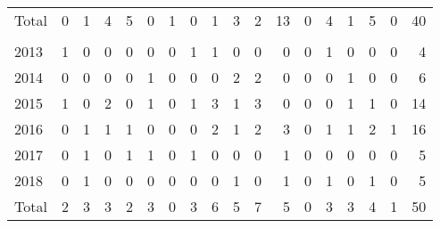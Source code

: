 \documentclass[a4paper]{article}
\begin{document}
\begin{table}
{\begin{tabular}[t]{lrrrrrrrrrrrrrrrrr}
\hspace{1em}\hspace{1em}Total & 0 & 1 & 4 & 5 & 0 & 1 & 0 & 1 & 3 & 2 & 13 & 0 & 4 & 1 & 5 & 0 & 40\\
\addlinespace[0.3em]
\multicolumn{18}{l}{\textbf{Intern}}\\
\hspace{1em}\hspace{1em}2013 & 1 & 0 & 0 & 0 & 0 & 0 & 1 & 1 & 0 & 0 & 0 & 0 & 1 & 0 & 0 & 0 & 4\\
\hspace{1em}\hspace{1em}2014 & 0 & 0 & 0 & 0 & 1 & 0 & 0 & 0 & 2 & 2 & 0 & 0 & 0 & 1 & 0 & 0 & 6\\
\hspace{1em}\hspace{1em}2015 & 1 & 0 & 2 & 0 & 1 & 0 & 1 & 3 & 1 & 3 & 0 & 0 & 0 & 1 & 1 & 0 & 14\\
\hspace{1em}\hspace{1em}2016 & 0 & 1 & 1 & 1 & 0 & 0 & 0 & 2 & 1 & 2 & 3 & 0 & 1 & 1 & 2 & 1 & 16\\
\hspace{1em}\hspace{1em}2017 & 0 & 1 & 0 & 1 & 1 & 0 & 1 & 0 & 0 & 0 & 1 & 0 & 0 & 0 & 0 & 0 & 5\\
\hspace{1em}\hspace{1em}2018 & 0 & 1 & 0 & 0 & 0 & 0 & 0 & 0 & 1 & 0 & 1 & 0 & 1 & 0 & 1 & 0 & 5\\
\hspace{1em}\hspace{1em}Total & 2 & 3 & 3 & 2 & 3 & 0 & 3 & 6 & 5 & 7 & 5 & 0 & 3 & 3 & 4 & 1 & 50\\
\bottomrule
\end{tabular}}
\end{table}
\end{document}
